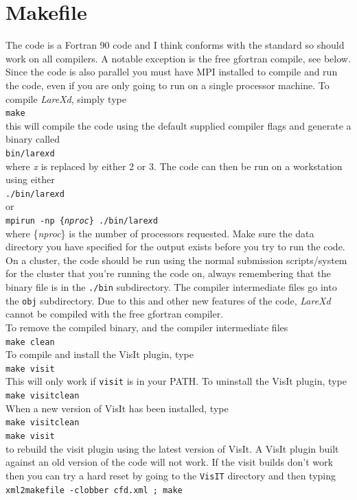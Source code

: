 \documentclass[11pt]{article}
\begin{document}
\section{Makefile}

The code is a Fortran 90 code and I think conforms with the standard so should work on all compilers. A notable exception is the free gfortran compile, see below. Since the code is also parallel you must have MPI installed to compile and run the code, even if you are only going to run on a single processor machine.
To compile {\it LareXd}, simply type\\
\texttt{make}\\
this will compile the code using the default supplied compiler flags and generate a binary called\\
\texttt{bin/lare{\it x}d}\\
where {\it x} is replaced by either 2 or 3. The code can then be run on a workstation using either\\
\texttt{./bin/lare{\it x}d}\\
or\\
\texttt{mpirun -np \{{\it nproc}\} ./bin/lare{\it x}d}\\
where \{{\it nproc}\} is the number of processors requested. Make sure the data directory you have specified for the output exists
before you try to run the code. On a cluster, the
code should be run using the normal submission scripts/system for the cluster
that you're running the code on, always remembering that the binary file is in
the \texttt{./bin} subdirectory. The compiler intermediate files go into the
\texttt{obj} subdirectory. Due to this and other new features of the code,
{\it LareXd} cannot be compiled with the free gfortran compiler.\\

To remove the compiled binary, and the compiler intermediate files\\
\texttt{make clean}\\
To compile and install the VisIt plugin, type\\
\texttt{make visit}\\
This will only work if \texttt{visit} is in your PATH. To uninstall the VisIt plugin, type\\
\texttt{make visitclean}\\
When a new version of VisIt has been installed, type\\
\texttt{make visitclean}\\
\texttt{make visit}\\
to rebuild the visit plugin using the latest version of VisIt. A VisIt plugin built against an old version of the code will not work. If the visit builds don't work then you can try a hard reset by going to the \texttt{VisIT} directory and then typing\\
 \texttt{xml2makefile -clobber cfd.xml ; make}
\end{document}
